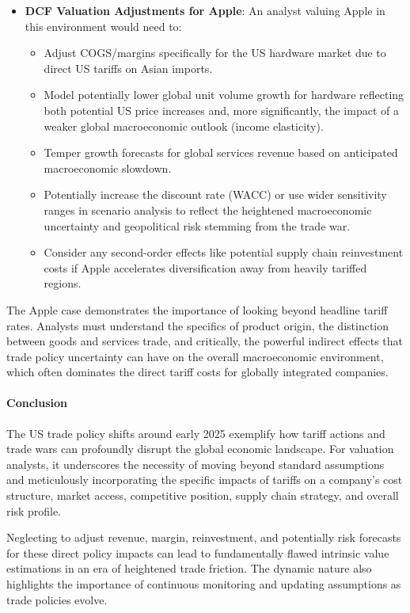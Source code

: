 \begin{itemize}
    \item \textbf{DCF Valuation Adjustments for Apple}:
          An analyst valuing Apple in this environment would need to:
          \begin{itemize}
              \item Adjust COGS/margins specifically for the US hardware market due to direct US tariffs on Asian imports.
              \item Model potentially lower global unit volume growth for hardware reflecting both potential US price increases and, more significantly, the impact of a weaker global macroeconomic outlook (income elasticity).
              \item Temper growth forecasts for global services revenue based on anticipated macroeconomic slowdown.
              \item Potentially increase the discount rate (WACC) or use wider sensitivity ranges in scenario analysis to reflect the heightened macroeconomic uncertainty and geopolitical risk stemming from the trade war.
              \item Consider any second-order effects like potential supply chain reinvestment costs if Apple accelerates diversification away from heavily tariffed regions.
          \end{itemize}
\end{itemize}

The Apple case demonstrates the importance of looking beyond headline tariff rates. Analysts must understand the specifics of product origin, the distinction between goods and services trade, and critically, the powerful indirect effects that trade policy uncertainty can have on the overall macroeconomic environment, which often dominates the direct tariff costs for globally integrated companies.

\paragraph{Conclusion}
The US trade policy shifts around early 2025 exemplify how tariff actions and trade wars can profoundly disrupt the global economic landscape. For valuation analysts, it underscores the necessity of moving beyond standard assumptions and meticulously incorporating the specific impacts of tariffs on a company's cost structure, market access, competitive position, supply chain strategy, and overall risk profile.

Neglecting to adjust revenue, margin, reinvestment, and potentially risk forecasts for these direct policy impacts can lead to fundamentally flawed intrinsic value estimations in an era of heightened trade friction. The dynamic nature also highlights the importance of continuous monitoring and updating assumptions as trade policies evolve.

